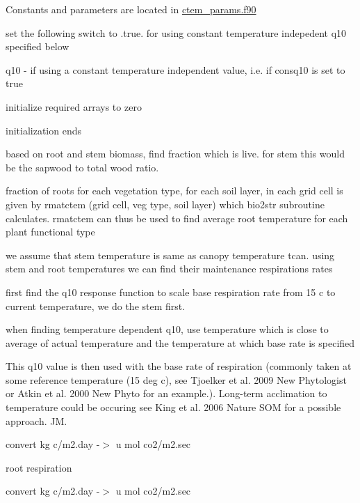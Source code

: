  Constants and parameters are located in \hyperlink{ctem__params_8f90}{ctem\+\_\+params.\+f90}

set the following switch to .true. for using constant temperature indepedent q10 specified below

q10 -\/ if using a constant temperature independent value, i.\+e. if consq10 is set to true





initialize required arrays to zero

initialization ends

based on root and stem biomass, find fraction which is live. for stem this would be the sapwood to total wood ratio.

fraction of roots for each vegetation type, for each soil layer, in each grid cell is given by rmatctem (grid cell, veg type, soil layer) which bio2str subroutine calculates. rmatctem can thus be used to find average root temperature for each plant functional type

we assume that stem temperature is same as canopy temperature tcan. using stem and root temperatures we can find their maintenance respirations rates

first find the q10 response function to scale base respiration rate from 15 c to current temperature, we do the stem first.

when finding temperature dependent q10, use temperature which is close to average of actual temperature and the temperature at which base rate is specified

This q10 value is then used with the base rate of respiration (commonly taken at some reference temperature (15 deg c), see Tjoelker et al. 2009 New Phytologist or Atkin et al. 2000 New Phyto for an example.). Long-\/term acclimation to temperature could be occuring see King et al. 2006 Nature S\+O\+M for a possible approach. J\+M.

convert kg c/m2.\+day -\/$>$ u mol co2/m2.\+sec

root respiration

convert kg c/m2.\+day -\/$>$ u mol co2/m2.\+sec 